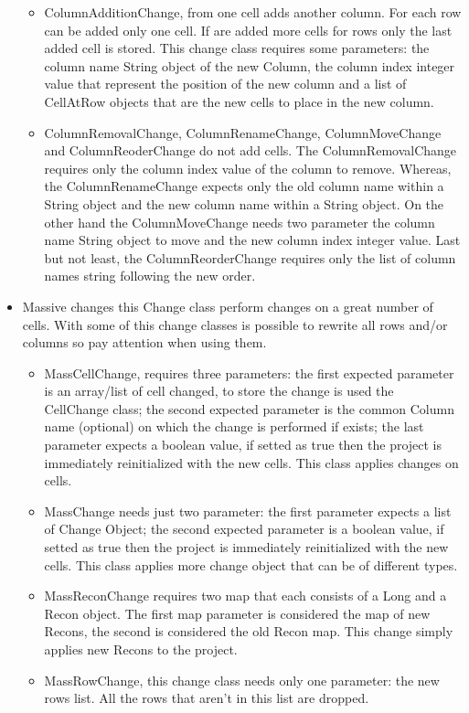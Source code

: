 \begin{itemize}
\begin{itemize}
		\item ColumnAdditionChange, from one cell adds another column. For each row can be added only one cell. If are added more cells for rows only the last added cell is stored. This change class requires some parameters: the column name String object of the new Column, the column index integer value that represent the position of the new column and a list of CellAtRow objects that are the new cells to place in the new column. 
		\item ColumnRemovalChange, ColumnRenameChange, ColumnMoveChange and ColumnReoderChange do not add cells. The ColumnRemovalChange requires only the column index value of the column to remove. Whereas, the ColumnRenameChange expects only the old column name within a String object and the new column name within a String object. On the other hand the ColumnMoveChange needs two parameter the column name String object to move and the new column index integer value. Last but not least, the ColumnReorderChange requires only the list of column names string following the new order.
    \end{itemize}	 
	\item \textsf{Massive changes} this Change class perform changes on a great number of cells. With some of this change classes is possible to rewrite all rows and/or columns so pay attention when using them.
	\begin{itemize}
		\item MassCellChange, requires three parameters: the first expected parameter is an array/list of cell changed, to store the change is used the CellChange class; the second expected parameter is the common Column name (optional) on which the change is performed if exists; the last parameter expects a boolean value, if setted as true then the project is immediately reinitialized with the new cells. This class applies changes on cells.
		\item MassChange needs just two parameter: the first parameter expects a list of Change Object; the second expected parameter is a boolean value,  if setted as true then the project is immediately reinitialized with the new cells. This class applies more change object that can be of different types.
		\item MassReconChange requires two map that each consists of a Long and a Recon object. The first map parameter is considered the map of new Recons, the second is considered the old Recon map. This change simply applies new Recons to the project.
		\item MassRowChange, this change class needs only one parameter: the new rows list. All the rows that aren't in this list are dropped.

\end{itemize}
\end{itemize}

